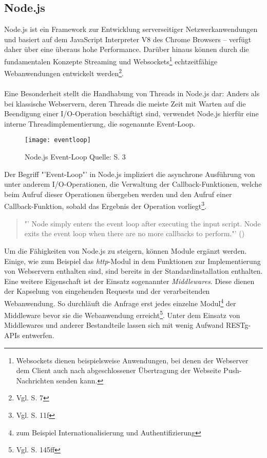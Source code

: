 \subsection{\label{Node.js}Node.js}
Node.js ist ein Framework zur Entwicklung serverseitiger Netzwerkanwendungen und basiert auf dem JavaScript Interpreter V8 des Chrome Browsers -- verfügt daher über eine überaus hohe Performance. Darüber hinaus können durch die fundamentalen Konzepte Streaming und Websockets\footnote{ Websockets dienen beispielsweise Anwendungen, bei denen der Webserver dem Client auch nach abgeschlossener Übertragung der Webseite Push-Nachrichten senden kann.} echtzeitfähige Webanwendungen entwickelt werden\footnote{ Vgl. \cite{nodeCo} S. 7}. \\\\
Eine Besonderheit stellt die Handhabung von Threads in Node.js dar:
Anders als bei klassische Webservern, deren Threads die meiste Zeit mit Warten auf die Beendigung einer I/O-Operation beschäftigt sind, verwendet Node.js hierfür eine interne Threadimplementierung, die sogenannte Event-Loop. 
\begin{figure}[H]
 \centering
    \texttt{[image: eventloop]}
\caption[Node.js Event-Loop]{Node.js Event-Loop Quelle: \cite{nodeWay} S. 3}
\label{fig:Nodejs_eventloop}
\end{figure}
Der Begriff "'Event-Loop"' in Node.js impliziert die asynchrone Ausführung von unter anderem I/O-Operationen, die Verwaltung der Callback-Funktionen, welche beim Aufruf dieser Operationen übergeben werden und den Aufruf einer Callback-Funktion, sobald das Ergebnis der Operation vorliegt\footnote{ Vgl. \cite{nodeCo} S. 11f}.
\begin{quote}
"' Node simply enters the event loop after executing the input script. Node exits the event loop when there are no more callbacks to perform."' (\cite{node})
\end{quote}
Um die Fähigkeiten von Node.js zu steigern, können Module ergänzt werden. Einige, wie zum Beispiel das \textit{http}-Modul in dem Funktionen zur Implementierung von Webservern enthalten sind, sind bereits in der Standardinstallation enthalten. 
Eine weitere Eigenschaft ist der Einsatz sogenannter \textit{Middlewares}. Diese dienen der Kapselung von eingehenden Requests und der verarbeitenden Webanwendung. So durchläuft die Anfrage erst jedes einzelne Modul\footnote{ zum Beispiel Internationalisierung und Authentifizierung} der Middleware bevor sie die Webanwendung erreicht\footnote{ Vgl. \cite{nodeCo} S. 145ff}. Unter dem Einsatz von Middlewares und anderer Bestandteile lassen sich mit wenig Aufwand \gls{RESTg}-\glspl{API} entwerfen.
